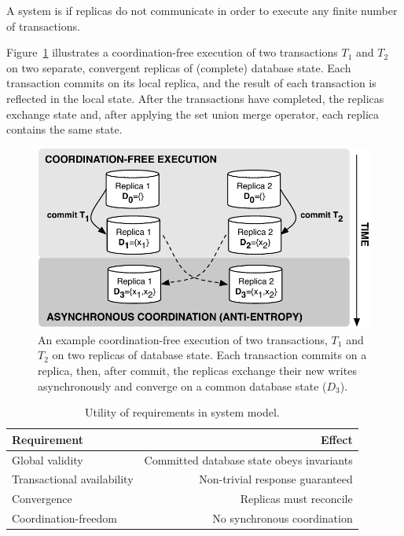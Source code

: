 \begin{definition}
A system is \textit{\cfree} if replicas do not communicate in order to
execute any finite number of transactions.
\end{definition}

Figure~\ref{fig:replicas} illustrates a coordination-free execution of
two transactions $T_1$ and $T_2$ on two separate, convergent replicas
of (complete) database state. Each transaction commits on its local
replica, and the result of each transaction is reflected in the local
state. After the transactions have completed, the replicas exchange
state and, after applying the set union merge operator, each replica
contains the same state.

\begin{figure}
\begin{center}
\includegraphics[width=.85\columnwidth]{figs/replicas.pdf}
\end{center}\vspace{-1em}
\caption{An example coordination-free execution of two transactions,
  $T_1$ and $T_2$ on two replicas of database state. Each transaction
  commits on a replica, then, after commit, the replicas exchange
  their new writes asynchronously and converge on a common database
  state ($D_3$).}
\label{fig:replicas}
\end{figure}


\begin{table}
\begin{center}
\small
\begin{tabular}{|l|r|}
\hline\textbf{Requirement} & \textbf{Effect}  \\\hline
Global validity & Committed database state obeys invariants  \\
Transactional availability & Non-trivial response guaranteed \\
Convergence & Replicas must reconcile \\
Coordination-freedom & No synchronous coordination\\\hline
\end{tabular}
\end{center}\vspace{-1em}
\caption{Utility of requirements in system model.}
\label{table:requirements}
\end{table}


